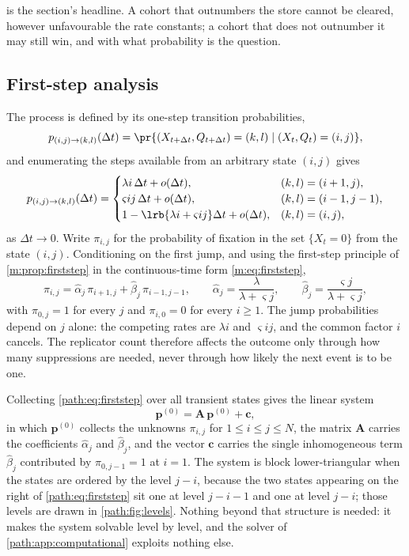  is the section's headline. A cohort that outnumbers the
store cannot be cleared, however unfavourable the rate constants; a cohort
that does not outnumber it may still win, and with what probability is the
question.

\subsection{First-step analysis}
\label{path:sec:rsfirststep}

The process is defined by its one-step transition probabilities,
\[
p_{(i,j)\to(k,l)}(\Delta t)
= \pr{(X_{t+\Delta t},Q_{t+\Delta t})=(k,l)\mid (X_t,Q_t)=(i,j)},
\]
and enumerating the steps available from an arbitrary state $(i,j)$ gives
\begin{equation}
p_{(i,j)\to(k,l)}(\Delta t)=
\begin{cases}
\lambda i\,\Delta t + o(\Delta t), & (k,l)=(i+1,j),\\
\varsigma ij\,\Delta t + o(\Delta t), & (k,l)=(i-1,j-1),\\
1-\lrb{\lambda i+\varsigma ij}\Delta t + o(\Delta t), & (k,l)=(i,j),
\end{cases}
\label{path:eq:onestep}
\end{equation}
as $\Delta t\to0$. Write $\pi_{i,j}$ for the probability of fixation in the
set $\{X_t=0\}$ from the state $(i,j)$. Conditioning on the first jump, and
using the first-step principle of \cref{m:prop:firststep} in the
continuous-time form \cref{m:eq:firststep},
\begin{equation}
\pi_{i,j} = \hat\alpha_j\,\pi_{i+1,j} + \hat\beta_j\,\pi_{i-1,j-1},
\qquad
\hat\alpha_j=\frac{\lambda}{\lambda+\varsigma j},
\qquad
\hat\beta_j=\frac{\varsigma j}{\lambda+\varsigma j},
\label{path:eq:firststep}
\end{equation}
with $\pi_{0,j}=1$ for every $j$ and $\pi_{i,0}=0$ for every $i\ge1$. The
jump probabilities depend on $j$ alone: the competing rates are $\lambda i$
and $\varsigma ij$, and the common factor $i$ cancels. The replicator count
therefore affects the outcome only through how many suppressions are needed,
never through how likely the next event is to be one.

Collecting \cref{path:eq:firststep} over all transient states gives the
linear system
\begin{equation}
\mathbf{p}^{(0)} = \mathbf{A}\,\mathbf{p}^{(0)} + \mathbf{c},
\label{path:eq:matrixsystem}
\end{equation}
in which $\mathbf{p}^{(0)}$ collects the unknowns $\pi_{i,j}$ for
$1\le i\le j\le N$, the matrix $\mathbf{A}$ carries the coefficients
$\hat\alpha_j$ and $\hat\beta_j$, and the vector $\mathbf{c}$ carries the
single inhomogeneous term $\hat\beta_j$ contributed by $\pi_{0,j-1}=1$ at
$i=1$. The system is block lower-triangular when the states are ordered by
the level $j-i$, because the two states appearing on the right of
\cref{path:eq:firststep} sit one at level $j-i-1$ and one at level $j-i$;
those levels are drawn in \cref{path:fig:levels}. Nothing beyond that
structure is needed: it makes the system solvable level by level, and the
solver of \cref{path:app:computational} exploits nothing else.

